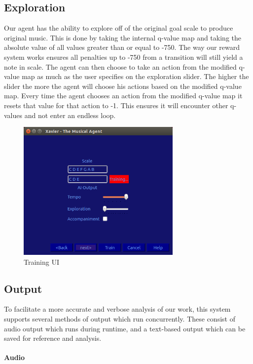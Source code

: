 \documentclass{chi2009}
\begin{document}
\subsection{Exploration}
Our agent has the ability to explore off of the original goal scale to produce original music. This is done by taking the internal q-value map and taking the absolute value of all values greater than or equal to -750. The way our reward system works ensures all penalties up to -750 from a transition will still yield a note in scale. The agent can then choose to take an action from the modified q-value map as much as the user specifies on the exploration slider. The higher the slider the more the agent will choose his actions based on the modified q-value map. Every time the agent chooses an action from the modified q-value map it resets that value for that action to -1. This ensures it will encounter other q-values and not enter an endless loop.

\begin{figure}[htp]
\centering
\includegraphics[width=8cm]{training_ui}
\caption{Training UI}
\label{fig:training_ui}
\end{figure}


\subsection{Output}

To facilitate a more accurate and verbose analysis of our work, this system supports several methods of output which run concurrently.  These consist of audio output which runs during runtime, and a text-based output which can be saved for reference and analysis.

\paragraph{Audio}
\end{document}
